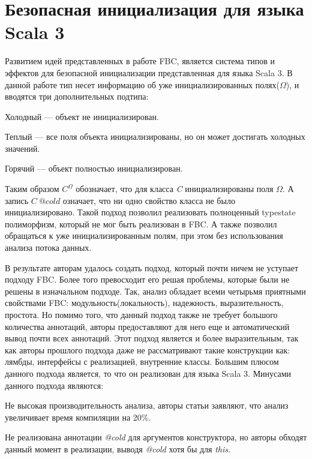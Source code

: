 \section{Безопасная инициализация для языка Scala 3}\label{sec:безопасная-инициализация-для-языка-scala-3}

Развитием идей представленных в работе FBC,
является система типов и эффектов для безопасной инициализации представленная для языка Scala 3\cite{safe-initialization-for-scala}.
В данной работе тип несет информацию об уже инициализированных полях($\Omega$), и вводятся три дополнительных подтипа:
\begin{itemize*}
    \item Холодный --- объект не инициализирован.
    \item Теплый --- все поля объекта инициализированы, но он может достигать холодных значений.
    \item Горячий --- объект полностью инициализирован.
\end{itemize*}
Таким образом $C^\Omega$ обозначает, что для класса \emph{C} инициализированы поля $\Omega$.
А запись $C~@cold$ означает, что ни одно свойство класса не было инициализировано.
Такой подход позволил реализовать полноценный typestate полиморфизм, который не мог быть реализован в FBC\@.
А также позволил обращаться к уже инициализированным полям, при этом без использования анализа потока данных.

В результате авторам удалось создать подход, который почти ничем не уступает подходу FBC\@.
Более того превосходит его решая проблемы, которые были не решены в изначальном подходе.
Так, анализ обладает всеми четырьмя приятными свойствами FBC: модульность(локальность), надежность, выразительность, простота.
Но помимо того, что данный подход также не требует большого количества аннотаций,
авторы предоставляют для него еще и автоматический вывод почти всех аннотаций.
Этот подход является и более выразительным, так как авторы прошлого подхода даже не рассматривают такие конструкции как:
лямбды, интерфейсы с реализацией, внутренние классы.
Большим плюсом данного подхода является, то что он реализован для языка Scala 3.
Минусами данного подхода являются:
\begin{itemize*}
    \item Не высокая производительность анализа, авторы статьи заявляют, что анализ увеличивает время компиляции на 20\%.
    \item Не реализована аннотации \emph{@cold} для аргументов конструктора,
    но авторы обходят данный момент в реализации, выводя \emph{@cold} хотя бы для \emph{this}.
\end{itemize*}

